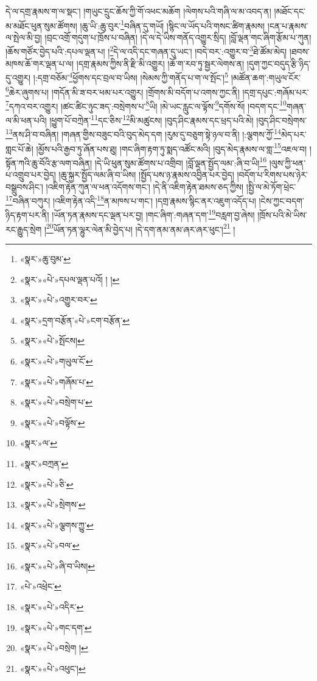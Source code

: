 དེ་ལ་དགྲ་རྣམས་ག་ལ་སྡང་། །གཡུང་དྲུང་ཆོས་ཀྱི་གོ་འཕང་མཆོག །ལེགས་པའི་གཞི་ལ་མ་འབད་ན། །མཐོང་དང་མ་མཐོང་ཕུན་སུམ་ཚོགས། །ཆུ་ཡི་:ཆུ་བུར་\footnote{«སྣར་»ཆུ་བུམ་}བཞིན་དུ་གཡོ། །སྙིང་ལ་ཡོད་པའི་གསང་ཚིག་རྣམས། །ངན་པ་རྣམས་ལ་སྤེལ་མི་བྱ། །བྲང་འགྲོ་གདུག་པ་ཁྲོས་པ་བཞིན། །དེ་ལ་དེ་ཡིས་གནོད་འགྱུར་སྲིད། །བློ་ལྡན་གང་ཞིག་རྩོམ་པ་ཀུན། །ཆོས་གཙོར་བྱེད་པའི་:དཔལ་ལྡན་པ། །\footnote{«སྣར་»«པེ་»དཔལ་ལྡན་པའོ། ། །}དེ་ལ་འདི་དང་གཞན་དུ་ཡང་། །བདེ་བར་:འགྱུར་བ་\footnote{«སྣར་»«པེ་»འགྱུར་བར་}ཐེ་ཚོམ་མེད། །ཐབས་མཁས་ཆོ་གར་ལྡན་པ་ལ། །དགྲ་རྣམས་ཀྱིས་ནི་རྫི་མི་འགྱུར། །ཆོ་ག་རབ་ཏུ་སྦྱར་ལེགས་ན། །དུག་ཀྱང་བདུད་རྩི་ཉིད་དུ་འགྱུར། །:དགྲ་བཅོམ་\footnote{«སྣར་»དྲག་བརྩོན་«པེ་»ངག་བརྩོན་}ཕྱོགས་དང་བྲལ་བ་ཡིས། །སེམས་ཀྱི་གནོད་པ་ག་ལ་སྤོང་།\footnote{«སྣར་»«པེ་»སྤོངས།} །མཚོན་ཆག་:གཡུལ་ངོར་\footnote{«སྣར་»«པེ་»གཡུལ་ངོ་}ཆེར་ཞུགས་པ། །གདོན་མི་ཟ་བར་ཕམ་པར་འགྱུར། །གྲོགས་མི་བདོག་པ་འགས་ཀྱང་ནི། །དགྲ་དཔུང་:གཞོམ་པར་\footnote{«སྣར་»«པེ་»གཞོམ་པ་}དཀའ་བར་འགྱུར། །ཚང་ཚིང་ཉུང་ཟད་:བསྲེགས་པ་\footnote{«སྣར་»«པེ་»བསྲེག་པ་}ཡི། །མེ་ཡང་རླུང་ལ་ལྟོས་\footnote{«སྣར་»«པེ་»བལྟོས་}དགོས་སོ། །བདག་དང་\footnote{«སྣར་»ལ་}གཞན་ལ་མི་ཕན་པའི། །ཕྱུག་པོ་བཀྲེན་\footnote{«སྣར་»བཀྲན་}དང་ཅིས་\footnote{«སྣར་»«པེ་»ཅི་}མི་མཚུངས། །བུད་ཤིང་རྣམས་དང་ཕྲད་པའི་མེ། །བུད་ཤིང་བསྲེགས་\footnote{«སྣར་»«པེ་»སྲེགས་}ནས་ཤི་བ་བཞིན། །གཞན་གྱིས་བཟུང་བའི་བུད་མེད་དག །རུམ་དུ་བཅུག་སྟེ་ཉལ་བ་ནི། །:ལྕགས་ཀྱོ་\footnote{«སྣར་»«པེ་»ལྕགས་ཀྱུ་}མེད་པར་གླང་པོ་ཆེ། །མྱོས་པའི་རྒྱབ་ཏུ་ཞོན་པས་ཐུ། །གང་ཞིག་རྟག་ཏུ་སྨད་འཚོང་མའི། །བུད་མེད་རྣམས་ལ་གླ་\footnote{«སྣར་»«པེ་»བལ་}འཇལ་བ། །སྟོན་ཀའི་ཆུ་བོའི་རྩ་ལག་བཞིན། །དེ་ཡི་ཕུན་སུམ་ཚོགས་པ་འགྲིབ། །བློ་ལྡན་སྤྱོད་ལམ་:ཞི་བ་ཡི།\footnote{«སྣར་»«པེ་»ཞི་བ་ཡིས།} །ལུས་ཀྱི་ཕན་པ་འགྲུབ་པར་བྱེད། །ཆུ་སྐྱར་སྤྱོད་ལམ་ཞི་བ་ཡིས། །སྤྱོད་པས་ཉ་རྣམས་འབྱིན་པར་བྱེད། །བདོག་པ་རིགས་པས་ཉེར་བསྒྲུབས་ཤིང་། །འཇིག་རྟེན་ཀུན་ལ་ཕན་འདོགས་གང་། །དེ་ནི་འཇིག་རྟེན་ཐམས་ཅད་ཀྱིས། །སྤྱི་ལ་མེ་ཏོག་ཕྲེང་\footnote{«པེ་»འཕྲེང་}བཞིན་བཀུར། །འཇིག་རྟེན་འདི་\footnote{«སྣར་»«པེ་»འདིར་}ན་མཁས་པ་གང་། །དགྲ་རྣམས་སྙིང་ནར་འཇུག་འདོད་པ། །ངེས་ཀྱང་བདག་ཉིད་རྟག་པར་ནི། །ཡོན་ཏན་རྣམས་དང་ལྡན་པར་བྱ། །གང་ཞིག་:གཞན་དག་\footnote{«སྣར་»«པེ་»གང་དག་}བརླག་བྱ་ཞེས། །ཁྲོས་པའི་མེ་ཡིས་རང་རྒྱུད་སྲེག །\footnote{«སྣར་»«པེ་»བསྲེག །}ཡོན་ཏན་ལྷུར་ལེན་མི་བྱེད་པ། །དེ་དག་ནམ་ནམ་ཞར་ཞར་ཕུང་།\footnote{«སྣར་»«པེ་»འཕུང་།} །
